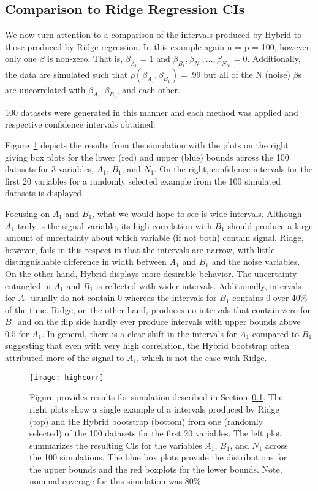 \subsection{Comparison to Ridge Regression CIs}\label{Sec:Ridge}

We now turn attention to a comparison of the intervals produced by Hybrid to those produced by Ridge regression. In this example again n = p = 100, however, only one $\beta$ is non-zero. That is, $\beta_{A_1} = 1$ and $\beta_{B_1}, \beta_{N_1}, \ldots, \beta_{N_{98}} = 0$. Additionally, the data are simulated such that $\rho(\beta_{A_1}, \beta_{B_1}) = .99$ but all of the N (noise) $\beta$s are uncorrelated with $\beta_{A_1}, \beta_{B_1}$, and each other.

100 datasets were generated in this manner and each method was applied and respective confidence intervals obtained.

Figure~\ref{Fig:highcorr} depicts the results from the simulation with the plots on the right giving box plots for the lower (red) and upper (blue) bounds across the 100 datasets for 3 variables, $A_1$, $B_1$, and $N_1$. On the right, confidence intervals for the first 20 variables for a randomly selected example from the 100 simulated datasets is displayed.

Focusing on $A_1$ and $B_1$, what we would hope to see is wide intervals. Although $A_1$ truly is the signal variable, its high correlation with $B_1$ should produce a large amount of uncertainty about which variable (if not both) contain signal. Ridge, however, fails in this respect in that the intervals are narrow, with little distinguishable difference in width between $A_1$ and $B_1$ and the noise variables. On the other hand, Hybrid displays more desirable behavior. The uncertainty entangled in $A_1$ and $B_1$ is reflected with wider intervals. Additionally, intervals for $A_1$ usually do not contain 0 whereas the intervals for $B_1$ contains 0 over 40\% of the time. Ridge, on the other hand, produces no intervals that contain zero for $B_1$ and on the flip side hardly ever produce intervals with upper bounds above $0.5$ for $A_1$. In general, there is a clear shift in the intervals for $A_1$ compared to $B_1$ suggesting that even with very high correlation, the Hybrid bootstrap often attributed more of the signal to $A_1$, which is not the case with Ridge.

\begin{figure}[hbtp]
  \texttt{[image: highcorr]}
  \caption{\label{Fig:highcorr} Figure provides results for simulation described in Section~\ref{Sec:Ridge}. The right plots show a single example of a intervals produced by Ridge (top) and the Hybrid bootstrap (bottom) from one (randomly selected) of the 100 datasets for the first 20 variables. The left plot summarizes the resulting CIs for the variables $A_1$, $B_1$, and $N_1$ across the 100 simulations. The blue box plots provide the distributions for the upper bounds and the red boxplots for the lower bounds. Note, nominal coverage for this simulation was 80\%.}
\end{figure}

